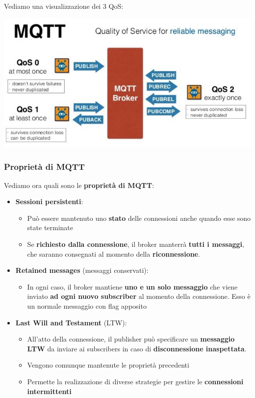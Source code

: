 \documentclass[12pt]{article}
\begin{document}
Vediamo una visualizzazione dei 3 QoS:
\begin{center}
    \includegraphics[width = 1\textwidth]{Images/145.PNG}
\end{center}
\subsubsection{Proprietà di MQTT}
Vediamo ora quali sono le \textbf{proprietà di MQTT}:
\begin{itemize}
    \item \textbf{Sessioni persistenti}:
          \begin{itemize}
              \item Può essere mantenuto uno \textbf{stato} delle connessioni anche quando esse sono state terminate
              \item Se \textbf{richiesto dalla connessione}, il broker manterrà \textbf{tutti i messaggi}, che saranno consegnati al momento della \textbf{riconnessione}.
          \end{itemize}
    \item \textbf{Retained messages} (messaggi conservati):
          \begin{itemize}
              \item In ogni caso, il broker mantiene \textbf{uno e un solo messaggio} che viene inviato \textbf{ad ogni nuovo subscriber} al momento della connessione. Esso è un normale messaggio con flag apposito
          \end{itemize}
    \item \textbf{Last Will and Testament} (LTW):
          \begin{itemize}
              \item All'atto della connessione, il publisher può specificare un \textbf{messaggio LTW} da inviare ai subscribers in caso di \textbf{disconnessione inaspettata}.
              \item Vengono comunque mantenute le proprietà precedenti
              \item Permette la realizzazione di diverse strategie per gestire le \textbf{connessioni intermittenti}
          \end{itemize}
\end{itemize}
\end{document}
